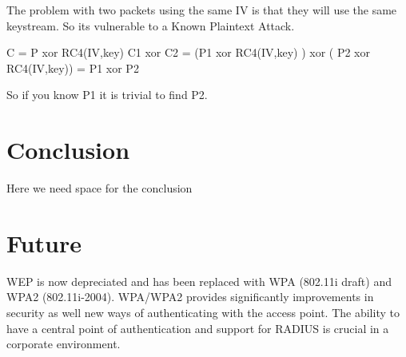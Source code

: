 \documentclass[twocolumn]{IEEEtran}
\begin{document}
The problem with two packets using the same IV is that they will use the same keystream. So its vulnerable to a Known Plaintext Attack.

C = P xor RC4(IV,key)
C1 xor C2 = (P1 xor RC4(IV,key) ) xor ( P2 xor RC4(IV,key)) = P1 xor P2

So if you know P1 it is trivial to find P2. 

\section {Conclusion}
\label{sec:conclusion}

Here we need space for the conclusion



\section {Future}
\label{sec:future}

WEP is now depreciated and has been replaced with WPA (802.11i draft) and WPA2 (802.11i-2004). WPA/WPA2 provides significantly improvements in security as well new ways of authenticating with the access point. The ability to have a central point  of authentication and support for RADIUS is crucial in a corporate environment.






\end{document}
